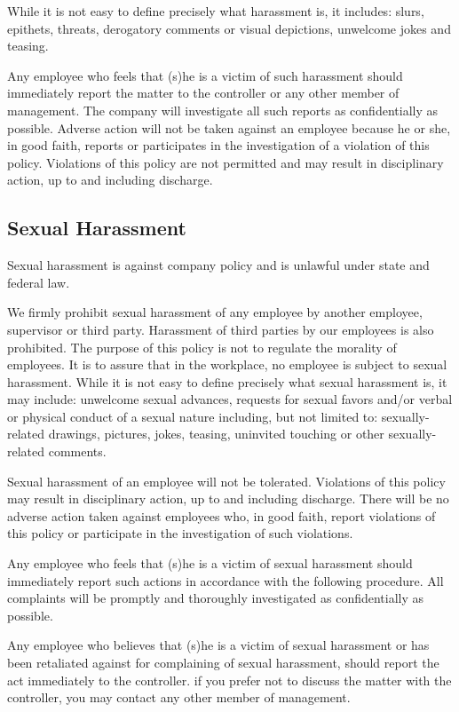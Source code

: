 While it is not easy to define precisely what harassment is, it includes: slurs, epithets, threats, derogatory comments or visual depictions, unwelcome jokes and teasing.

Any employee who feels that (s)he is a victim of such harassment should immediately report the matter to the controller or any other member of management. The company will investigate all such reports as confidentially as possible. Adverse action will not be taken against an employee because he or she, in good faith, reports or participates in the investigation of a violation of this policy. Violations of this policy are not permitted and may result in disciplinary action, up to and including discharge.

\subsection{Sexual Harassment}

Sexual harassment is against company policy and is unlawful under state and federal law.

We firmly prohibit sexual harassment of any employee by another employee, supervisor or third party. Harassment of third parties by our employees is also prohibited. The purpose of this policy is not to regulate the morality of employees. It is to assure that in the workplace, no employee is subject to sexual harassment. While it is not easy to define precisely what sexual harassment is, it may include: unwelcome sexual advances, requests for sexual favors and/or verbal or physical conduct of a sexual nature including, but not limited to: sexually-related drawings, pictures, jokes, teasing, uninvited touching or other sexually-related comments.

Sexual harassment of an employee will not be tolerated. Violations of this policy may result in disciplinary action, up to and including discharge. There will be no adverse action taken against employees who, in good faith, report violations of this policy or participate in the investigation of such violations.

Any employee who feels that (s)he is a victim of sexual harassment should immediately report such actions in accordance with the following procedure. All complaints will be promptly and thoroughly investigated as confidentially as possible.

Any employee who believes that (s)he is a victim of sexual harassment or has been retaliated against for complaining of sexual harassment, should report the act immediately to the controller. if you prefer not to discuss the matter with the controller, you may contact any other member of management.

